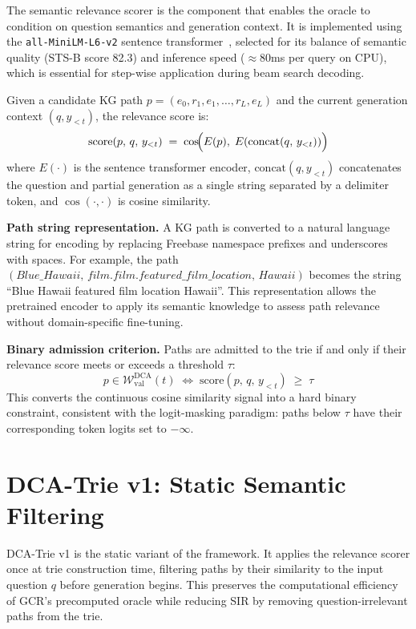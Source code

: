 The semantic relevance scorer is the component that enables the oracle to condition on question semantics and generation context. It is implemented using the \texttt{all-MiniLM-L6-v2} sentence transformer~\citep{reimers2019sbert}, selected for its balance of semantic quality (STS-B score 82.3) and inference speed ($\approx$80ms per query on CPU), which is essential for step-wise application during beam search decoding.

Given a candidate KG path $p = (e_0, r_1, e_1, \ldots, r_L, e_L)$ and the current generation context $(q, y_{<t})$, the relevance score is:
\[
    \text{score}(p,\, q,\, y_{<t}) \;=\; \cos\!\Bigl(E(p),\; E\!\left(\text{concat}(q,\, y_{<t})\right)\Bigr)
\]
where $E(\cdot)$ is the sentence transformer encoder, $\text{concat}(q, y_{<t})$ concatenates the question and partial generation as a single string separated by a delimiter token, and $\cos(\cdot, \cdot)$ is cosine similarity.

\textbf{Path string representation.} A KG path is converted to a natural language string for encoding by replacing Freebase namespace prefixes and underscores with spaces. For example, the path $(\textit{Blue\_Hawaii},\, \textit{film.film.featured\_film\_location},\, \textit{Hawaii})$ becomes the string ``Blue Hawaii featured film location Hawaii''. This representation allows the pretrained encoder to apply its semantic knowledge to assess path relevance without domain-specific fine-tuning.

\textbf{Binary admission criterion.} Paths are admitted to the trie if and only if their relevance score meets or exceeds a threshold $\tau$:
\[
    p \in \mathcal{W}_{\text{val}}^{\text{DCA}}(t) \;\iff\; \text{score}(p,\, q,\, y_{<t}) \;\geq\; \tau
\]
This converts the continuous cosine similarity signal into a hard binary constraint, consistent with the logit-masking paradigm: paths below $\tau$ have their corresponding token logits set to $-\infty$.

\section{DCA-Trie v1: Static Semantic Filtering}
\label{sec:v1}

DCA-Trie v1 is the static variant of the framework. It applies the relevance scorer once at trie construction time, filtering paths by their similarity to the input question $q$ before generation begins. This preserves the computational efficiency of GCR's precomputed oracle while reducing SIR by removing question-irrelevant paths from the trie.

